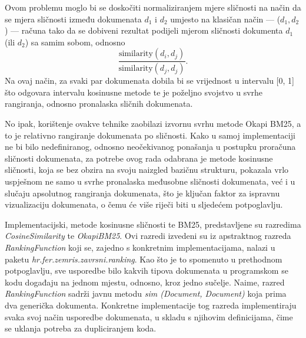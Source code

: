 \documentclass[times, utf8, zavrsni, numeric]{fer}
\begin{document}
Ovom problemu moglo bi se doskočiti normaliziranjem mjere sličnosti na način da se mjera sličnosti između dokumenata $d_1$ i $d_2$ umjesto na klasičan način — ($d_1, d_2$) — računa tako da se dobiveni rezultat podijeli mjerom sličnosti dokumenta $d_1$ (ili $d_2$) sa samim sobom, odnosno
\begin{equation}
\frac{\text{similarity}(d_i, d_j)}{\text{similarity}(d_j, d_j)}.
\label{eq:docsim}
\end{equation}
Na ovaj način, za svaki par dokumenata dobila bi se vrijednost u intervalu [0, 1] što odgovara intervalu kosinusne metode te je poželjno svojstvo u svrhe rangiranja, odnosno pronalaska sličnih dokumenata. \par
No ipak, korištenje ovakve tehnike zaobilazi izvornu svrhu metode Okapi BM25, a to je relativno rangiranje dokumenata po sličnosti. Kako u samoj implementaciji ne bi bilo nedefiniranog, odnosno neočekivanog ponašanja u postupku proračuna sličnosti dokumenata, za potrebe ovog rada odabrana je metode kosinusne sličnosti, koja se bez obzira na svoju naizgled bazičnu strukturu, pokazala vrlo uspješnom ne samo u svrhe pronalaska međusobne sličnosti dokumenata, već i u slučaju apsolutnog rangiranja dokumenata, što je ključan faktor za ispravnu vizualizaciju dokumenata, o čemu će više riječi biti u sljedećem potpoglavlju.

Implementacijski, metode kosinusne sličnosti te BM25, predstavljene su razredima \textit{CosineSimilarity} te \textit{OkapiBM25}. Ovi razredi izvedeni su iz apstraktnog razreda \textit{RankingFunction} koji se, zajedno s konkretnim implementacijama, nalazi u paketu \textit{hr.fer.zemris.zavrsni.ranking}. Kao što je to spomenuto u prethodnom potpoglavlju, sve usporedbe bilo kakvih tipova dokumenata u programskom se kodu događaju na jednom mjestu, odnosno, kroz jedno sučelje. Naime, razred \textit{RankingFunction} sadrži javnu metodu \textit{sim (Document, Document)} koja prima dva generička dokumenta. Konkretne implementacije tog razreda implementiraju svaka svoj način usporedbe dokumenata, u skladu s njihovim definicijama, čime se uklanja potreba za dupliciranjem koda.
\end{document}
